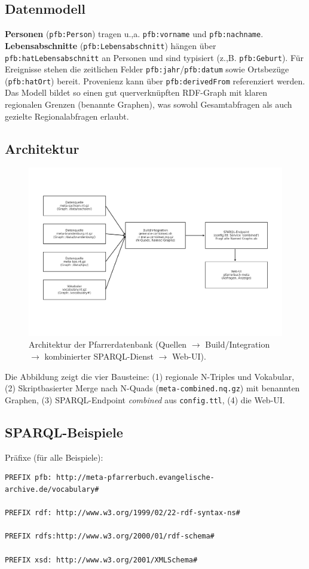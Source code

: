 \subsection{Datenmodell}
\textbf{Personen} (\texttt{pfb:Person}) tragen u.,a. \texttt{pfb:vorname} und \texttt{pfb:nachname}. \textbf{Lebensabschnitte}
(\texttt{pfb:Lebensabschnitt}) hängen über \texttt{pfb:hatLebensabschnitt} an Personen und sind typisiert
(z.,B. \texttt{pfb:Geburt}). Für Ereignisse stehen die zeitlichen Felder \texttt{pfb:jahr}/\texttt{pfb:datum} sowie Ortsbezüge
(\texttt{pfb:hatOrt}) bereit. Provenienz kann über \texttt{pfb:derivedFrom} referenziert werden. Das Modell bildet so einen gut querverknüpften RDF-Graph mit klaren regionalen Grenzen (benannte Graphen), was sowohl Gesamtabfragen als auch gezielte Regionalabfragen erlaubt.

\subsection{Architektur}
\begin{figure}[h]
\centering
\includegraphics[width=\linewidth]{Abbildungen/Aufbau_Pfarrerdatenbank.jpg}
\caption{Architektur der Pfarrerdatenbank (Quellen $\rightarrow$ Build/Integration $\rightarrow$ kombinierter SPARQL-Dienst $\rightarrow$ Web-UI).}
\label{fig:pfarrer-architektur}
\end{figure}

\noindent Die Abbildung zeigt die vier Bausteine: (1) regionale N-Triples und Vokabular, (2) Skriptbasierter Merge nach N-Quads
(\texttt{meta-combined.nq.gz}) mit benannten Graphen, (3) SPARQL-Endpoint \emph{combined} aus \texttt{config.ttl}, (4) die Web-UI.

\subsection{SPARQL-Beispiele}
\noindent Präfixe (für alle Beispiele):
\begin{verbatim}
PREFIX pfb: http://meta-pfarrerbuch.evangelische-archive.de/vocabulary#

PREFIX rdf: http://www.w3.org/1999/02/22-rdf-syntax-ns#

PREFIX rdfs:http://www.w3.org/2000/01/rdf-schema#

PREFIX xsd: http://www.w3.org/2001/XMLSchema#

\end{verbatim}

